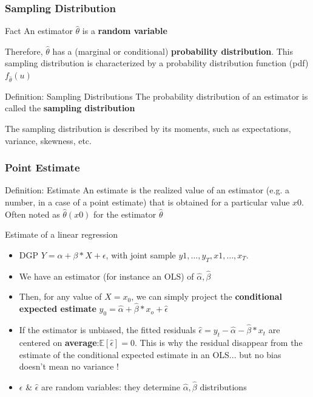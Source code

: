 \documentclass{beamer}
\begin{document}
\begin{frame}
  \frametitle{Sampling Distribution}

  \begin{block}{Fact}
    An estimator $\hat{\theta}$ is a \textbf{random variable}
  \end{block}
  Therefore, $\hat{\theta}$ has a (marginal or conditional) \textbf{probability distribution}. This sampling distribution is characterized by a probability distribution function (pdf) $f_{\hat{\theta}}(u)$

  \begin{block}{Definition: Sampling Distributions}
    The probability distribution of an estimator is called the \textbf{sampling distribution}
  \end{block}
  The sampling distribution is described by its moments, such as expectations, variance, skewness, etc.
  \end{frame}


  \begin{frame}
    \frametitle{Point Estimate}
    \begin{block}{Definition: Estimate}
      An estimate is the realized value of an estimator (e.g. a number, in a case of a point estimate) that is obtained for a particular value $x0$. Often noted as $\hat{\theta}(x0)$ for the estimator $\hat{\theta}$
    \end{block}

    \begin{exampleblock}{Estimate of a linear regression}
      \begin{itemize}
      \item DGP $Y = \alpha + \beta*X + \epsilon$, with joint sample ${y1, \dots, y_T}, {x1, \dots, x_T}$.\\
      \item We have an estimator (for instance an OLS) of $\hat{\alpha}, \hat{\beta}$
      \item Then, for any value of $X=x_0$, we can simply project the \textbf{conditional expected estimate} $y_0 = \hat{\alpha} + \hat{\beta}*x_o + \hat{\epsilon}$
      \item If the estimator is unbiased, the fitted residuals $\hat{\epsilon} = y_t - \hat{\alpha} - \hat{\beta}*x_t$ are centered on \textbf{average}:$\mathbb{E}\left[\hat{\epsilon}\right]=0$. This is why the residual disappear from the estimate of the conditional expected estimate in an OLS... but no bias doesn't mean no variance !
      \item $\epsilon$ \& $\hat{\epsilon}$ are random variables: they determine $\hat{\alpha}, \hat{\beta}$ distributions
      \end{itemize}
    \end{exampleblock}    
  \end{frame}
\end{document}
